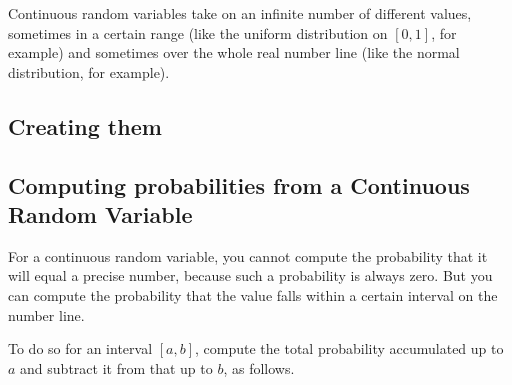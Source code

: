 \documentclass[letterpaper,10pt,english]{jupyterBook}
\begin{document}
\sphinxAtStartPar
Continuous random variables take on an infinite number of different values, sometimes in a certain range (like the uniform distribution on \([0,1]\), for example) and sometimes over the whole real number line (like the normal distribution, for example).


\subsection{Creating them}
\label{\detokenize{GB213-review-in-Python:id1}}
\begin{sphinxVerbatim}[commandchars=\\\{\}]
     
     
      
\end{sphinxVerbatim}


\subsection{Computing probabilities from a Continuous Random Variable}
\label{\detokenize{GB213-review-in-Python:computing-probabilities-from-a-continuous-random-variable}}
\sphinxAtStartPar
For a continuous random variable, you cannot compute the probability that it will equal a precise number, because such a probability is always zero.  But you can compute the probability that the value falls within a certain interval on the number line.

\sphinxAtStartPar
To do so for an interval \([a,b]\), compute the total probability accumulated up to \(a\) and subtract it from that up to \(b\), as follows.

\begin{sphinxVerbatim}[commandchars=\\\{\}]
      
        
\end{sphinxVerbatim}
\end{document}
